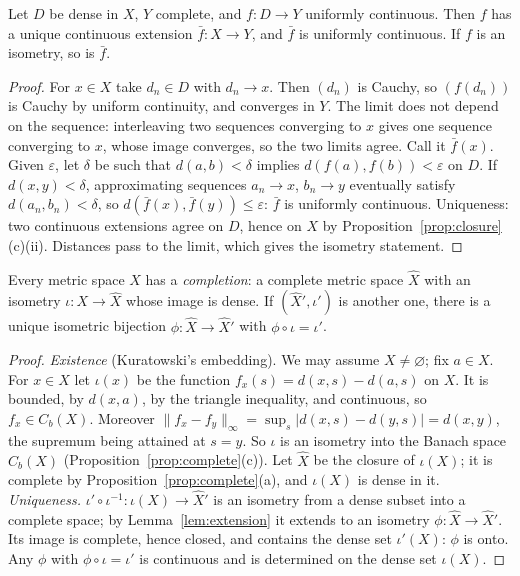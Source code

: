 \begin{lemma}[extension]\label{lem:extension}
Let $D$ be dense in $X$, $Y$ complete, and $f:D\to Y$ uniformly continuous. Then $f$ has a unique continuous extension
$\bar f:X\to Y$, and $\bar f$ is uniformly continuous. If $f$ is an isometry, so is $\bar f$.
\end{lemma}
\begin{proof}
For $x\in X$ take $d_n\in D$ with $d_n\to x$. Then $(d_n)$ is Cauchy, so $(f(d_n))$ is Cauchy by uniform continuity, and converges in $Y$.
The limit does not depend on the sequence: interleaving two sequences converging to $x$ gives one sequence converging to $x$,
whose image converges, so the two limits agree. Call it $\bar f(x)$. Given $\varepsilon$, let $\delta$ be such that $d(a,b)<\delta$ implies
$d(f(a),f(b))<\varepsilon$ on $D$. If $d(x,y)<\delta$, approximating sequences $a_n\to x$, $b_n\to y$ eventually satisfy $d(a_n,b_n)<\delta$, so
$d(\bar f(x),\bar f(y))\le\varepsilon$: $\bar f$ is uniformly continuous. Uniqueness: two continuous extensions agree on $D$, hence on $X$ by
Proposition~\ref{prop:closure}(c)(ii). Distances pass to the limit, which gives the isometry statement.
\end{proof}

\begin{theorem}[completion]\label{thm:completion}
Every metric space $X$ has a \emph{completion}: a complete metric space $\hat X$ with an isometry $\iota:X\to\hat X$ whose image is dense. If
$(\hat X',\iota')$ is another one, there is a unique isometric bijection $\phi:\hat X\to\hat X'$ with $\phi\circ\iota=\iota'$.
\end{theorem}
\begin{proof}
\emph{Existence} (Kuratowski's embedding). We may assume $X\ne\varnothing$; fix $a\in X$. For $x\in X$ let $\iota(x)$ be the function $f_x(s)=d(x,s)-d(a,s)$ on $X$.
It is bounded, by $d(x,a)$, by the triangle inequality, and continuous, so $f_x\in C_b(X)$. Moreover
$\|f_x-f_y\|_\infty=\sup_s|d(x,s)-d(y,s)|=d(x,y)$, the supremum being attained at $s=y$. So $\iota$ is an isometry into the Banach space $C_b(X)$
(Proposition~\ref{prop:complete}(c)). Let $\hat X$ be the closure of $\iota(X)$; it is complete by Proposition~\ref{prop:complete}(a), and $\iota(X)$ is dense in it.
\emph{Uniqueness.} $\iota'\circ\iota^{-1}:\iota(X)\to\hat X'$ is an isometry from a dense subset into a complete space; by Lemma~\ref{lem:extension} it extends to an isometry
$\phi:\hat X\to\hat X'$. Its image is complete, hence closed, and contains the dense set $\iota'(X)$: $\phi$ is onto. Any $\phi$ with $\phi\circ\iota=\iota'$ is continuous and
is determined on the dense set $\iota(X)$.
\end{proof}

